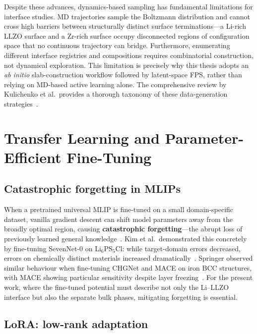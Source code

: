 \documentclass[12pt,a4paper,oneside]{book}
\begin{document}
Despite these advances, dynamics-based sampling has fundamental limitations for interface studies. MD trajectories sample the Boltzmann distribution and cannot cross high barriers between structurally distinct surface terminations---a Li-rich LLZO surface and a Zr-rich surface occupy disconnected regions of configuration space that no continuous trajectory can bridge. Furthermore, enumerating different interface registries and compositions requires combinatorial construction, not dynamical exploration. This limitation is precisely why this thesis adopts an \emph{ab initio} slab-construction workflow followed by latent-space FPS, rather than relying on MD-based active learning alone. The comprehensive review by Kulichenko et al.\ provides a thorough taxonomy of these data-generation strategies~\cite{Kulichenko2024review}.

\section{Transfer Learning and Parameter-Efficient Fine-Tuning}
\label{sec:finetuning}

\subsection{Catastrophic forgetting in MLIPs}

When a pretrained universal MLIP is fine-tuned on a small domain-specific dataset, vanilla gradient descent can shift model parameters away from the broadly optimal region, causing \textbf{catastrophic forgetting}---the abrupt loss of previously learned general knowledge~\cite{Kirkpatrick2017}. Kim et al.\ demonstrated this concretely by fine-tuning SevenNet-0 on Li$_6$PS$_5$Cl: while target-domain errors decreased, errors on chemically distinct materials increased dramatically~\cite{Kim2025}. Springer observed similar behaviour when fine-tuning CHGNet and MACE on iron BCC structures, with MACE showing particular sensitivity despite layer freezing~\cite{Springer2025}. For the present work, where the fine-tuned potential must describe not only the Li--LLZO interface but also the separate bulk phases, mitigating forgetting is essential.

\subsection{LoRA: low-rank adaptation}
\end{document}
